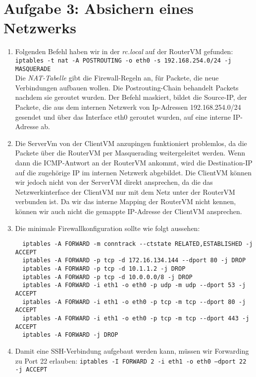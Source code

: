 \documentclass{scrartcl}
\begin{document}
	\section*{Aufgabe 3: Absichern eines Netzwerks}
	\label{sec:Absichern eines Netzwerks}
	\begin{enumerate}[\bfseries 1.]
		\item
		      Folgenden Befehl haben wir in der \textit{rc.local} auf der RouterVM gefunden:\\
		      \texttt{iptables -t nat -A POSTROUTING -o eth0 -s 192.168.254.0/24 -j MASQUERADE}\\
		      Die \textit{NAT-Tabelle} gibt die Firewall-Regeln an, für Packete, die neue
		      Verbindungen aufbauen wollen. Die Postrouting-Chain behandelt Packets nachdem
		      sie geroutet wurden. Der Befehl maskiert, bildet die Source-IP, der Packete,
		      die aus dem internen Netzwerk von Ip-Adressen 192.168.254.0/24 gesendet und
		      über das Interface eth0 geroutet wurden, auf eine interne IP-Adresse ab.

		\item
		      Die ServerVm von der ClientVM anzupingen funktioniert problemlos,
		      da die Packete über die RouterVM per Masquerading weitergeleitet werden.
		      Wenn dann die ICMP-Antwort an der RouterVM ankommt, wird die Destination-IP
		      auf die zugehörige IP im internen Netzwerk abgebildet.
		      Die ClientVM können wir jedoch nicht von der ServerVM direkt ansprechen, da
		      die das Netzwerkinterface der ClientVM nur mit dem Netz unter der RouterVM
		      verbunden ist. Da wir das interne Mapping der RouterVM nicht kennen, können
		      wir auch nicht die gemappte IP-Adresse der ClientVM ansprechen.

		\item
		      Die minimale Firewallkonfiguration sollte wie folgt aussehen:
		      \begin{lstlisting}
  iptables -A FORWARD -m conntrack --ctstate RELATED,ESTABLISHED -j ACCEPT
  iptables -A FORWARD -p tcp -d 172.16.134.144 --dport 80 -j DROP
  iptables -A FORWARD -p tcp -d 10.1.1.2 -j DROP
  iptables -A FORWARD -p tcp -d 10.0.0.0/8 -j DROP
  iptables -A FORWARD -i eth1 -o eth0 -p udp -m udp --dport 53 -j ACCEPT
  iptables -A FORWARD -i eth1 -o eth0 -p tcp -m tcp --dport 80 -j ACCEPT
  iptables -A FORWARD -i eth1 -o eth0 -p tcp -m tcp --dport 443 -j ACCEPT
  iptables -A FORWARD -j DROP
		\end{lstlisting}

		\item
		      Damit eine SSH-Verbindung aufgebaut werden kann, müssen wir Forwarding zu Port
		      22 erlauben: \texttt{iptables -I FORWARD 2 -i eth1 -o eth0 --dport 22 -j ACCEPT}


\end{enumerate}
\end{document}
